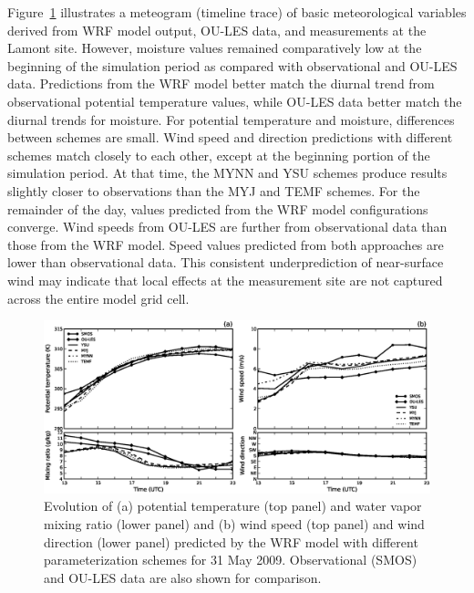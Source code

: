 Figure~\ref{figure438} illustrates a meteogram (timeline trace) of basic meteorological variables derived from WRF model output, OU-LES data, and measurements at the Lamont site. However, moisture values remained comparatively low at the beginning of the simulation period as compared with observational and OU-LES data. Predictions from the WRF model better match the diurnal trend from observational potential temperature values, while OU-LES data better match the diurnal trends for moisture. For potential temperature and moisture, differences between schemes are small. Wind speed and direction predictions with different schemes match closely to each other, except at the beginning portion of the simulation period. At that time, the MYNN and YSU schemes produce results slightly closer to observations than the MYJ and TEMF schemes. For the remainder of the day, values predicted from the WRF model configurations converge. Wind speeds from OU-LES are further from observational data than those from the WRF model. Speed values predicted from both approaches are lower than observational data. This consistent underprediction of near-surface wind may indicate that local effects at the measurement site are not captured across the entire model grid cell.


\begin{figure}[ht!]
\begin{center}
\includegraphics[width=\textwidth]{figures/chapter4/meteogram_phys_20090531}
\end{center}
\caption{Evolution of (a) potential temperature (top panel) and water vapor mixing ratio (lower panel) and (b) wind speed (top panel) and wind direction (lower panel) predicted by the WRF model with different parameterization schemes for 31 May 2009. Observational (SMOS) and OU-LES data are also shown for comparison.}
\label{figure438}
\end{figure}


